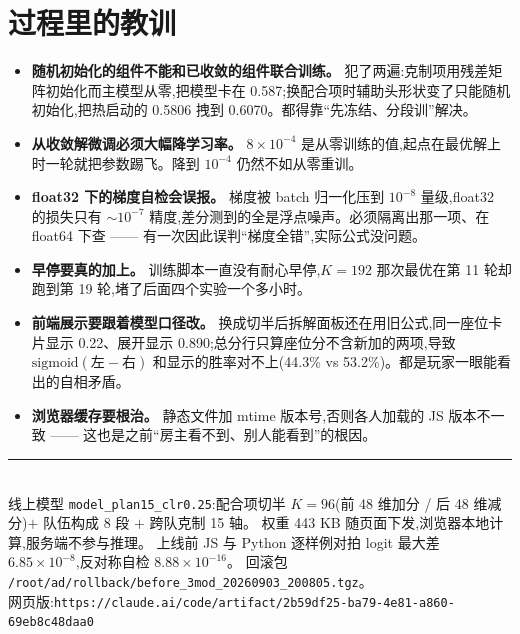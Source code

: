\documentclass[11pt,a4paper]{article}
\begin{document}
\section{过程里的教训}
\begin{itemize}
\item \textbf{随机初始化的组件不能和已收敛的组件联合训练。} 犯了两遍:克制项用残差矩阵初始化而主模型从零,把模型卡在 0.587;换配合项时辅助头形状变了只能随机初始化,把热启动的 0.5806 拽到 0.6070。都得靠“先冻结、分段训”解决。
\item \textbf{从收敛解微调必须大幅降学习率。} $8\times10^{-4}$ 是从零训练的值,起点在最优解上时一轮就把参数踢飞。降到 $10^{-4}$ 仍然不如从零重训。
\item \textbf{float32 下的梯度自检会误报。} 梯度被 batch 归一化压到 $10^{-8}$ 量级,float32 的损失只有 $\sim10^{-7}$ 精度,差分测到的全是浮点噪声。必须隔离出那一项、在 float64 下查 —— 有一次因此误判“梯度全错”,实际公式没问题。
\item \textbf{早停要真的加上。} 训练脚本一直没有耐心早停,$K=192$ 那次最优在第 11 轮却跑到第 19 轮,堵了后面四个实验一个多小时。
\item \textbf{前端展示要跟着模型口径改。} 换成切半后拆解面板还在用旧公式,同一座位卡片显示 0.22、展开显示 0.890;总分行只算座位分不含新加的两项,导致 $\mathrm{sigmoid}(\text{左}-\text{右})$ 和显示的胜率对不上(44.3\% vs 53.2\%)。都是玩家一眼能看出的自相矛盾。
\item \textbf{浏览器缓存要根治。} 静态文件加 mtime 版本号,否则各人加载的 JS 版本不一致 —— 这也是之前“房主看不到、别人能看到”的根因。
\end{itemize}

\vfill
\noindent\rule{\textwidth}{0.4pt}\\
{\footnotesize\color{mut}
线上模型 \texttt{model\_plan15\_clr0.25}:配合项切半 $K{=}96$(前 48 维加分 / 后 48 维减分)$+$ 队伍构成 8 段 $+$ 跨队克制 15 轴。
权重 443 KB 随页面下发,浏览器本地计算,服务端不参与推理。
上线前 JS 与 Python 逐样例对拍 logit 最大差 $6.85\times10^{-8}$,反对称自检 $8.88\times10^{-16}$。
回滚包 \texttt{/root/ad/rollback/before\_3mod\_20260903\_200805.tgz}。\\
网页版:\texttt{https://claude.ai/code/artifact/2b59df25-ba79-4e81-a860-69eb8c48daa0}}
\end{document}
